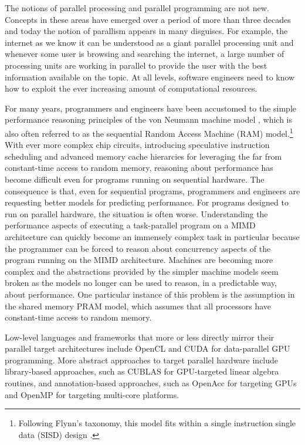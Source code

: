 \documentclass[oneside,11pt]{book}
\begin{document}
The notions of parallel processing and parallel programming are not
new. Concepts in these areas have emerged over a period of more than three
decades and today the notion of parallism appears in many
disguises. For example, the internet as we know it can be understood
as a giant parallel processing unit and whenever some user is browsing
and searching the internet, a large number of processing units are
working in parallel to provide the user with the best information
available on the topic. At all levels, software engineers need to know
how to exploit the ever increasing amount of computational resources.

For many years, programmers and engineers have been accustomed to the
simple performance reasoning principles of the von Neumann machine
model \cite{vonneumann1945}, which is also often referred to as the
sequential Random Access Machine (RAM) model.\footnote{Following
  Flynn's taxonomy, this model fits within a single instruction single
  data (SISD) design \cite{Flynn1972}.} With ever more complex chip
circuits, introducing speculative instruction scheduling and advanced
memory cache hierarcies for leveraging the far from constant-time
access to random memory, reasoning about performance has become
difficult even for programs running on sequential hardware. The
consequence is that, even for sequential programs, programmers and
engineers are requesting better models for predicting performance. For
programs designed to run on parallel hardware, the situation is often
worse. Understanding the performance aspects of executing a
task-parallel program on a MIMD architecture can quickly become an
immensely complex task in particular because the programmer can be
forced to reason about concurrency aspects of the program running on
the MIMD architecture. Machines are becoming more complex and the
abstractions provided by the simpler machine models seem broken as the
models no longer can be used to reason, in a predictable way, about
performance. One particular instance of this problem is the assumption
in the shared memory PRAM model, which assumes that all processors
have constant-time access to random memory.

Low-level languages and frameworks that more or less directly mirror
their parallel target architectures include OpenCL \cite{opencl2011}
and CUDA \cite{Nickolls:2008:SPP:1365490.1365500} for data-parallel
GPU programming. More abstract approaches to target parallel hardware
include library-based approaches, such as CUBLAS for GPU-targeted
linear algebra routines, and annotation-based approaches, such as
OpenAcc for targeting GPUs and OpenMP for targeting multi-core
platforms.
\end{document}
